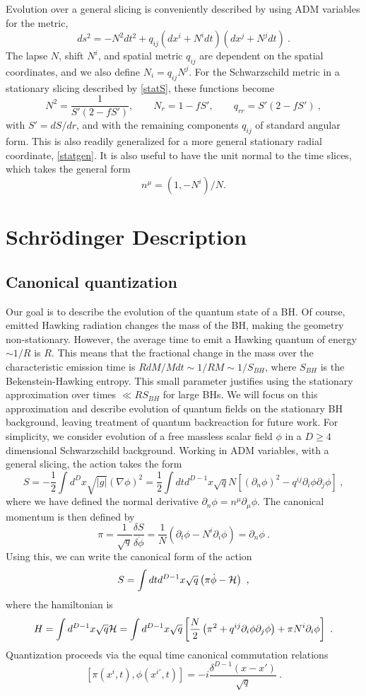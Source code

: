 \documentclass[12pt]{article}
\numberwithin{equation}{section}
\newcommand{\calh}{{\cal H}}
\newcommand{\beq}{\begin{equation}}
\newcommand{\eeq}{\end{equation}}
\newcommand{\hf}{\frac{1}{2}}
\begin{document}
Evolution over a general  slicing is conveniently described by using ADM variables\cite{ADM} for the metric,
\beq
\label{ADMmet}
ds^2 = -N^2 dt^2 +q_{ij}(dx^i + N^i dt)(dx^j + N^j dt)\ .
\eeq
The lapse $N$, shift $N^i$, and spatial metric $q_{ij}$ are dependent on the spatial coordinates, and we also define
$N_i =q_{ij} N^j$. For the Schwarzschild metric in a stationary slicing described by \eqref{statS}, these functions become\cite{NVU}
\beq\label{ADMvar}
N^2 = \frac{1}{S'(2-f S')},\quad \quad N_r = 1-f S',\quad\quad q_{rr} = S'(2-f S')\ ,
\eeq
with $S'=dS/dr$, and
with the remaining components $q_{ij}$ of standard angular form.  This is also readily generalized for a more general stationary radial coordinate, 
\eqref{statgen}.
It is also useful to have the unit normal to the time slices, which takes the general form 
\beq\label{normdef}
n^{\mu} = (1,-N^i)/N .
\eeq


\section{Schr\"odinger Description}
\label{Schsec}

\subsection{Canonical quantization}

Our goal is to describe the evolution of the quantum state of a BH.  
Of course, emitted Hawking radiation changes the mass of the BH, making the geometry non-stationary.  However, the average time to emit a Hawking quantum of energy $\sim 1/R$ is $R$.  This means that the fractional change in the mass over the characteristic emission time is $R dM/Mdt\sim 1/RM \sim 1/S_{BH}$, where $S_{BH}$ is the Bekenstein-Hawking entropy.  This small parameter justifies using the stationary approximation over times $\ll R S_{BH}$ for large BHs.  We will focus on this approximation and describe evolution of quantum fields on the stationary BH background, leaving treatment of quantum backreaction for future work.
For simplicity, we consider  evolution of a free massless scalar field $\phi$ in a $D\geq 4$ dimensional Schwarzschild background. Working in ADM variables, with a general slicing, the action takes the form 
\beq\label{Sact}
S=-\hf \int d^D x \sqrt{|g|} (\nabla\phi)^2 =  \frac{1}{2} \int dt d^{D-1}x \sqrt q N \left[ (\partial_n\phi)^2 - q^{ij}\partial_i \phi \partial_j \phi\right]\ ,
\eeq
where we have defined the normal derivative $\partial_n\phi=n^\mu\partial_\mu \phi$.  
The canonical momentum is then defined by
\beq\label{canonmom}
\pi= \frac{1}{\sqrt q}\frac{\delta S}{ \delta \dot\phi} = \frac{1}{N}\left(\partial_t \phi - N^i\partial_i\phi\right) = \partial_n\phi\ .
\eeq
Using this, we can write the canonical form of the action
\beq
S=\int dt d^{D-1}x \sqrt q \left(\pi \dot\phi  - \calh\right)\ ,
\eeq
where the hamiltonian is
\beq\label{ADMH}
H =  \int d^{D-1} x \sqrt q \calh= \int d^{D-1} x \sqrt q \left[ \frac{N}{2}\left(\pi^2+q^{ij}\partial_i\phi \partial_j\phi\right) + \pi N^i \partial_i\phi \right] \ .
\eeq 
Quantization proceeds via the equal time canonical commutation relations
\beq\label{CCRs}
[\pi(x^i, t), \phi(x^{i\prime}, t)]=-i \frac{\delta^{D-1}(x-x')}{\sqrt{q}}\ .
\eeq
\end{document}
